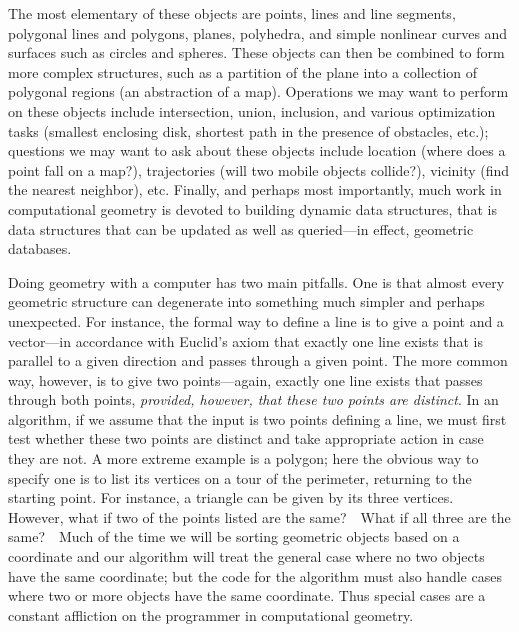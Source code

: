 \documentclass[11pt]{article}
\begin{document}
The most elementary of these objects are points, lines and line segments,
polygonal lines and polygons, planes, polyhedra, and simple nonlinear curves
and surfaces such as circles and spheres.  These objects can then be combined
to form more complex structures, such as a partition of the plane into
a collection of polygonal regions (an abstraction of a map).  Operations
we may want to perform on these objects include intersection, union,
inclusion, and various optimization tasks (smallest enclosing disk, shortest
path in the presence of obstacles, etc.); questions we may want to ask about
these objects include location (where does a point fall on a map?),
trajectories (will two mobile objects collide?), vicinity (find the nearest
neighbor), etc.  Finally, and perhaps most importantly, much work in
computational geometry is devoted to building dynamic data structures, that
is data structures that can be updated as well as queried---in effect,
geometric databases.

Doing geometry with a computer has two main pitfalls.  One is that almost
every geometric structure can degenerate into something much simpler and
perhaps unexpected.  For instance, the formal way to define a line is to
give a point and a vector---in accordance with Euclid's axiom that exactly
one line exists that is parallel to a given direction and passes through a
given point.  The more common way, however, is to give two points---again,
exactly one line exists that passes through both points, \emph{provided,
however, that these two points are distinct}.  In an algorithm, if we
assume that the input is two points defining a line, we must first test
whether these two points are distinct and take appropriate action in
case they are not.  A more extreme example is a polygon; here the obvious
way to specify one is to list its vertices on a tour of the perimeter, returning
to the starting point.   For instance, a triangle can be given by its three
vertices.  However, what if two of the points listed are the same?\ \ What if
all three are the same?\ \ Much of the time we will be sorting geometric
objects based on a coordinate and our algorithm will treat the general case
where no two objects have the same coordinate; but the code for the algorithm
must also handle cases where two or more objects have the same coordinate.
Thus special cases are a constant affliction on the programmer in computational
geometry.
\end{document}
